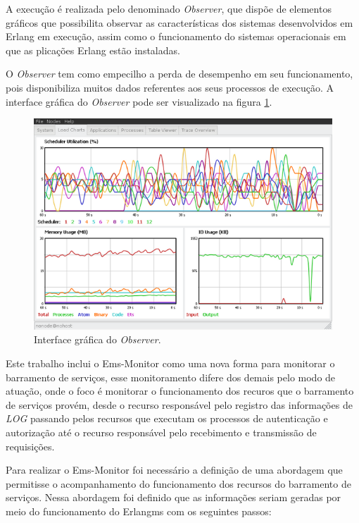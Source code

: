 A execução é realizada pelo denominado \textit{Observer}, que dispõe de elementos gráficos que possibilita observar as características dos sistemas desenvolvidos em Erlang \cite{ericssonAB2002-2019} em execução, assim como o funcionamento do sistemas operacionais em que as plicações Erlang estão instaladas. 

O \textit{Observer} tem como empecilho a perda de desempenho em seu funcionamento, pois disponibiliza muitos dados referentes aos seus processos de execução. A interface gráfica do \textit{Observer} pode ser visualizado na figura \ref{fun:fig:observer}. 

\begin{figure}[H]
	\begin{center}
	\includegraphics[scale = 0.70]{img/observerGo.jpg}
		\caption{Interface gráfica do \textit{Observer}.}
		\label{fun:fig:observer}
	\end{center}
\end{figure}

Este trabalho inclui o Ems-Monitor como uma nova forma para monitorar o barramento de serviços, esse monitoramento difere dos demais pelo modo de atuação, onde o foco é monitorar o funcionamento dos recuros que o barramento de serviços provém, desde o recurso responsável pelo registro das informações de \textit{LOG} passando pelos recursos que executam os processos de autenticação e autorização até o recurso responsável pelo recebimento e transmissão de requisições. 

Para realizar o Ems-Monitor foi necessário a definição de uma abordagem que permitisse o acompanhamento do funcionamento dos recursos do barramento de serviços. Nessa abordagem foi definido que as informações seriam geradas por meio do funcionamento do Erlangms com os seguintes passos:

